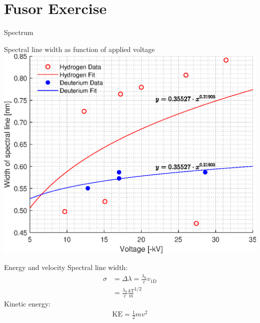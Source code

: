 \documentclass[hyperref={colorlinks=true,urlcolor=blue,linkcolor=.},aspectratio=1610,mathserif]{beamer}
\begin{document}
\section{Fusor Exercise}

\begin{frame}{Spectrum}
	\begin{figure}[H]
		\centering
	\end{figure}
\end{frame}

\begin{frame}{Spectral line width as function of applied voltage}
	\centering
	\includegraphics[width=.9\textwidth]{MatlabFigures/Asign3/VSigma.eps}
\end{frame}

\begin{frame}{Energy and velocity}
	Spectral line width:
	\begin{align}
		\sigma & = \Delta\lambda = \frac{\lambda_0}{c} v_\mathrm{1D} \\
		       & = \frac{\lambda_0}{c}\frac{kT}{m}^{1/2}
	\end{align}
	Kinetic energy:
	\begin{align}
		\mathrm{KE} = \frac{1}{2}mv^2
	\end{align}
\end{frame}
\end{document}
